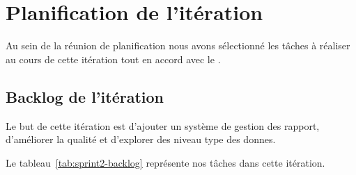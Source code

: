 

\section{Planification de l'itération}

Au sein de la réunion de planification nous avons sélectionné les tâches à
réaliser au cours de cette itération tout en accord avec le .

\subsection{Backlog de l'itération}

Le but de cette itération est d'ajouter un système de gestion des rapport,
d'améliorer la qualité et d'explorer des niveau type des donnes.

Le tableau~\ref{tab:sprint2-backlog} représente nos tâches dans cette itération.

